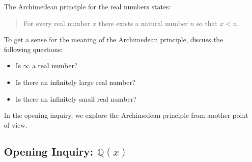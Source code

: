 \documentclass[11pt]{article}
\theoremstyle{definition}
\begin{document}
The Archimedean principle for the real numbers states: 
\begin{quote}
For every real number $x$ there exists a natural number $n$ so that $x < n$.
\end{quote}
To get a sense for the meaning of the Archimedean principle, discuss the following questions:
\begin{itemize}
  \item Is $\infty$ a real number?
  \item Is there an infinitely large real number?
  \item Is there an infinitely small real number?
\end{itemize}

In the opening inquiry, we explore the Archimedean principle from another point of view.

\subsection{Opening Inquiry: $\mathbb{Q}(x)$}
\end{document}
